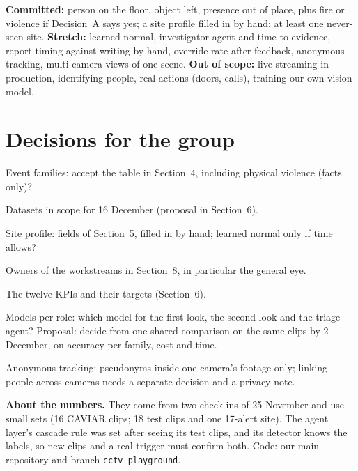 \documentclass[11pt,a4paper]{article}
\begin{document}
\textbf{Committed:} person on the floor, object left, presence out of place, plus fire or violence if Decision~A
says yes; a site profile filled in by hand; at least one never-seen site.
\textbf{Stretch:} learned normal, investigator agent and time to evidence, report timing against writing by hand,
override rate after feedback, anonymous tracking, multi-camera views of one scene.
\textbf{Out of scope:} live streaming in production, identifying people, real actions (doors, calls), training our
own vision model.

\section{Decisions for the group}
\begin{description}[leftmargin=1.6em,labelwidth=1.2em,font=\bfseries\color{accent}]
\item[A.] Event families: accept the table in Section~4, including physical violence (facts only)?
\item[B.] Datasets in scope for 16 December (proposal in Section~6).
\item[C.] Site profile: fields of Section~5, filled in by hand; learned normal only if time allows?
\item[D.] Owners of the workstreams in Section~8, in particular the general eye.
\item[E.] The twelve KPIs and their targets (Section~6).
\item[F.] Models per role: which model for the first look, the second look and the triage agent? Proposal: decide
from one shared comparison on the same clips by 2 December, on accuracy per family, cost and time.
\item[G.] Anonymous tracking: pseudonyms inside one camera's footage only; linking people across cameras needs a
separate decision and a privacy note.
\end{description}

\vspace{0.5em}
{\footnotesize\color{gray}\textbf{About the numbers.} They come from two check-ins of 25 November and use small sets
(16 CAVIAR clips; 18 test clips and one 17-alert site). The agent layer's cascade rule was set after seeing its test
clips, and its detector knows the labels, so new clips and a real trigger must confirm both. Code: our main
repository and branch \texttt{cctv-playground}.\par}
\end{document}
